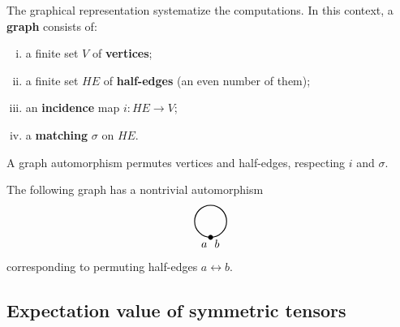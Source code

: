 The graphical representation systematize the computations. In this context, a \textbf{graph} consists of:
\begin{enumerate}[i)]
  \item a finite set $V$ of \textbf{vertices};
  \item a finite set $HE$ of \textbf{half-edges} (an even number of them);
  \item an \textbf{incidence} map $i: HE \to V$;
  \item a \textbf{matching} $\sigma$ on $HE$.
\end{enumerate}
A graph automorphism permutes vertices and half-edges, respecting $i$ and $\sigma$.

\begin{example}
  The following graph has a nontrivial automorphism
  \begin{equation*}
    \begin{tikzpicture}
      \draw[fill=black] (0, 0) circle (2pt);
      \draw[thick] (0, .5) circle (5mm);
      \node at (-.2, -.24) {$a$};
      \node at (.2, -.2) {$b$};
    \end{tikzpicture}
  \end{equation*}
  corresponding to permuting half-edges $a \leftrightarrow b$.
\end{example}

\subsection{Expectation value of symmetric tensors}

